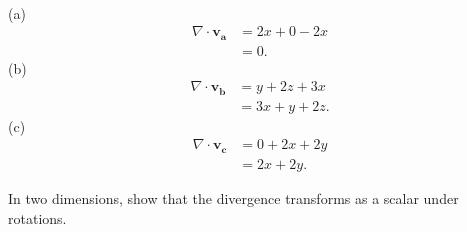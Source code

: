         \begin{sol}[1.15]~\\
            (a)
            \begin{equation}
                \begin{aligned}
                    \nabla\cdot\mathbf{v_a} &=2x+0-2x \\
                    &= 0.
                \end{aligned}
            \end{equation}
            \noindent (b)
            \begin{equation}
                \begin{aligned}
                    \nabla\cdot\mathbf{v_b} &= y + 2z + 3x \\
                    &=3x + y + 2z.
                \end{aligned}
            \end{equation}
            \noindent (c)
            \begin{equation}
                \begin{aligned}
                    \nabla\cdot\mathbf{v_c} &= 0 + 2x + 2y \\
                    &=2x + 2y.
                \end{aligned}
            \end{equation}
        \end{sol}
        \begin{prob}[1.17]
            In two dimensions, 
            show that the divergence transforms as a scalar 
            under rotations.
        \end{prob}

